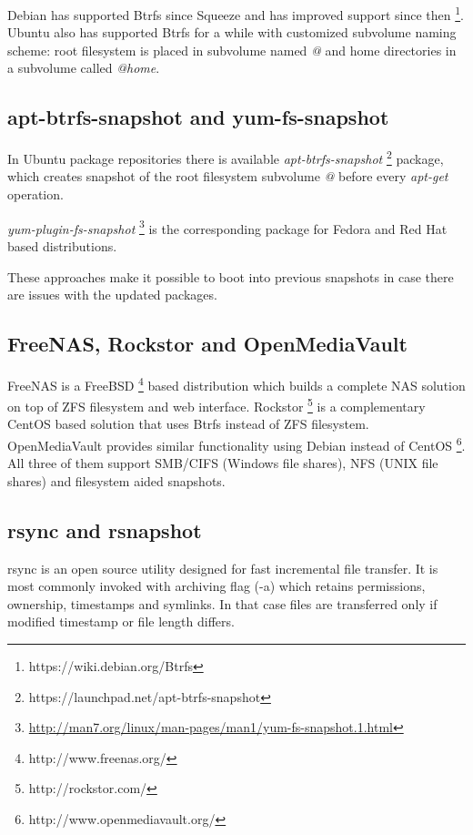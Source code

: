 \documentclass[a4paper,11pt]{kth-mag}
\begin{document}
Debian has supported Btrfs since Squeeze and has improved support
since then \footnote{https://wiki.debian.org/Btrfs}.
Ubuntu also has supported Btrfs for a while with customized
subvolume naming scheme:
root filesystem is placed in subvolume named \emph{@}
and home directories in a subvolume called \emph{@home}.

\subsection{apt-btrfs-snapshot and yum-fs-snapshot}

In Ubuntu package repositories there is available
\emph{apt-btrfs-snapshot}
\footnote{https://launchpad.net/apt-btrfs-snapshot}
package,
which creates snapshot of the root filesystem subvolume \emph{@}
before every \emph{apt-get} operation.

\emph{yum-plugin-fs-snapshot}
\footnote{\url{http://man7.org/linux/man-pages/man1/yum-fs-snapshot.1.html}}
is the corresponding package for Fedora and
Red Hat based distributions.

These approaches make it possible to boot into previous snapshots
in case there are issues with the updated packages.

\subsection{FreeNAS, Rockstor and OpenMediaVault}

FreeNAS is a FreeBSD \footnote{http://www.freenas.org/}
based distribution which builds a complete NAS solution on top of
ZFS filesystem and web interface.
Rockstor \footnote{http://rockstor.com/}
is a complementary CentOS based solution that uses Btrfs instead
of ZFS filesystem.
OpenMediaVault provides similar functionality using Debian instead of CentOS
\footnote{http://www.openmediavault.org/}.
All three of them support SMB/CIFS (Windows file shares),
NFS (UNIX file shares) and filesystem aided snapshots.





\subsection{rsync and rsnapshot}

rsync is an open source utility designed for
fast incremental file transfer.
It is most commonly invoked with archiving flag (-a) which
retains permissions, ownership, timestamps and symlinks.
In that case files are transferred only if
modified timestamp or file length differs.
\end{document}
